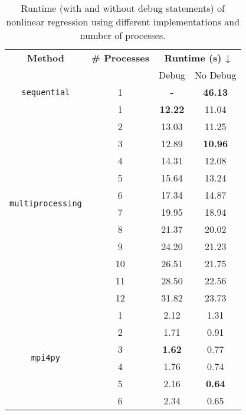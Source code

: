 \documentclass[12pt,letterpaper, onecolumn]{exam}
\begin{document}
\begin{questions}
\begin{parts}
\begin{solution}
            \begin{table}[H]
                \centering
                \begin{tabular}{|c|c|c|c|}
                    \hline
                    \textbf{Method} & \textbf{\# Processes} & \multicolumn{2}{c|}{\textbf{Runtime (s) ↓}} \\
                    \cline{3-4}
                                    &                       & Debug & No Debug \\
                    \hline
                    \multirow{1}{*}{\texttt{sequential}} 
                        & 1  & \textbf{-} & \textbf{46.13} \\
                    \hline
                    \multirow{12}{*}{\texttt{multiprocessing}}
                        & 1  & \textbf{12.22} & 11.04 \\
                        & 2  & 13.03 & 11.25 \\
                        & 3  & 12.89 & \textbf{10.96} \\
                        & 4  & 14.31 & 12.08 \\
                        & 5  & 15.64 & 13.24 \\
                        & 6  & 17.34 & 14.87 \\
                        & 7  & 19.95 & 18.94 \\
                        & 8  & 21.37 & 20.02 \\
                        & 9  & 24.20 & 21.23 \\
                        & 10 & 26.51 & 21.75 \\
                        & 11 & 28.50 & 22.56 \\
                        & 12 & 31.82 & 23.73 \\
                    \hline
                    \multirow{6}{*}{\texttt{mpi4py}} 
                        & 1 & 2.12 & 1.31 \\
                        & 2 & 1.71 & 0.91 \\
                        & 3 & \textbf{1.62}  & 0.77  \\
                        & 4 & 1.76  & 0.74  \\
                        & 5 & 2.16  & \textbf{0.64}  \\
                        & 6 & 2.34  & 0.65 \\
                    \hline
                \end{tabular}
                \caption{Runtime (with and without debug statements) of nonlinear regression using different implementations and number of processes.}
                \label{tab:runtime_nonlinear_regression}
            \end{table}


\end{solution}
\end{parts}
\end{questions}
\end{document}
